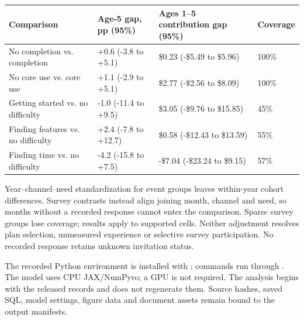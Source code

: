 \documentclass[10pt]{article}
\begin{document}
{\fontsize{8}{10}\selectfont \par\begin{tabularx}{\linewidth}{@{}p{.27\linewidth}YYp{.09\linewidth}@{}}\toprule
\textbf{Comparison} & \textbf{Age-5 gap, pp (95\%)} & \textbf{Ages 1--5 contribution gap (95\%)} & \textbf{Coverage}\\\midrule
No completion vs. completion & +0.6 (-3.8 to +5.1) & \$0.23 (-\$5.49 to \$5.96) & 100\%\\
No core use vs. core use & +1.1 (-2.9 to +5.1) & \$2.77 (-\$2.56 to \$8.09) & 100\%\\
Getting started vs. no difficulty & -1.0 (-11.4 to +9.5) & \$3.05 (-\$9.76 to \$15.85) & 45\%\\
Finding features vs. no difficulty & +2.4 (-7.8 to +12.7) & \$0.58 (-\$12.43 to \$13.59) & 55\%\\
Finding time vs. no difficulty & -4.2 (-15.8 to +7.5) & -\$7.04 (-\$23.24 to \$9.15) & 57\%\\
\bottomrule\end{tabularx}\par}
Year--channel--need standardization for event groups leaves within-year cohort differences. Survey contrasts instead align joining month, channel and need, so months without a recorded response cannot enter the comparison. Sparse survey groups lose coverage; results apply to supported cells. Neither adjustment resolves plan selection, unmeasured experience or selective survey participation. No recorded response retains unknown invitation status.

\NewPage
{}
The recorded Python environment is installed with ; commands run through . The model uses CPU JAX/NumPyro; a GPU is not required. The analysis begins with the released records and does not regenerate them. Source hashes, saved SQL, model settings, figure data and document assets remain bound to the output manifests.
\end{document}

